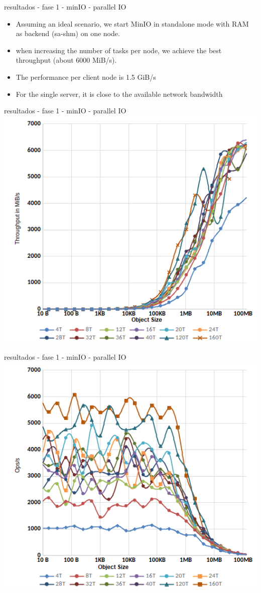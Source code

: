 \documentclass{beamer}
\begin{document}
\begin{frame}{resultados - fase 1 - minIO - parallel IO}
	\begin{itemize}
		\item Assuming an ideal scenario, we
		start MinIO in standalone mode with RAM as backend (sa-shm) on one node.
		\item when increasing the number of tasks per node, we achieve the best
		throughput (about 6000 MiB/s).
		\item The performance per client node is 1.5 GiB/s
		\item For the
		single server, it is close to the available network bandwidth
	\end{itemize}
\end{frame}
\begin{frame}{resultados - fase 1 - minIO - parallel IO}
    \includegraphics[width=0.7\paperwidth]{presentation/9.png}
\end{frame}
\begin{frame}{resultados - fase 1 - minIO - parallel IO}
    \includegraphics[width=0.7\paperwidth]{presentation/10.png}
\end{frame}
\end{document}
